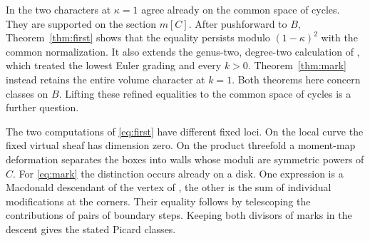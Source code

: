 In \cite[Theorem~1.1]{W} the two characters at $\kappa=1$ agree
already on the common space of cycles. They are supported on the
section $m[C]$. After pushforward to $B$, Theorem~\ref{thm:first} shows that the
equality persists modulo $(1-\kappa)^2$ with the common normalization. It also extends
the genus-two, degree-two calculation of \cite[Theorem~1.2]{W},
which treated the lowest Euler grading and every $k>0$.
Theorem~\ref{thm:mark} instead retains the entire volume character
at $k=1$. Both theorems here concern classes on $B$. Lifting these
refined equalities to the common space of cycles is a further question.

The two computations of \eqref{eq:first} have different fixed loci.
On the local curve the fixed virtual sheaf has dimension zero. On
the product threefold a moment-map deformation separates the boxes
into walls whose moduli are symmetric powers of $C$. For
\eqref{eq:mark} the distinction occurs already on a disk. One
expression is a Macdonald descendant of the vertex of
\cite{DS}, the other is the sum of individual modifications at the
corners. Their equality follows by telescoping the contributions of
pairs of boundary steps. Keeping both divisors of marks in the
descent gives the stated Picard classes.

